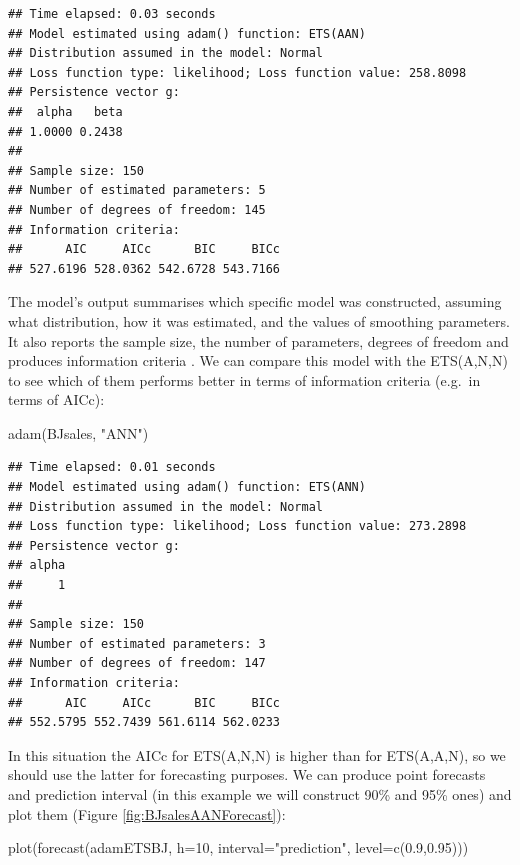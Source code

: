 \documentclass[
]{book}
\newenvironment{Shaded}{\begin{snugshade}}{\end{snugshade}}
\newcommand{\AttributeTok}[1]{\textcolor[rgb]{0.77,0.63,0.00}{#1}}
\newcommand{\DecValTok}[1]{\textcolor[rgb]{0.00,0.00,0.81}{#1}}
\newcommand{\FloatTok}[1]{\textcolor[rgb]{0.00,0.00,0.81}{#1}}
\newcommand{\FunctionTok}[1]{\textcolor[rgb]{0.00,0.00,0.00}{#1}}
\newcommand{\NormalTok}[1]{#1}
\newcommand{\StringTok}[1]{\textcolor[rgb]{0.31,0.60,0.02}{#1}}
\theoremstyle{definition}
\theoremstyle{definition}
\theoremstyle{definition}
\theoremstyle{definition}
\theoremstyle{remark}
\begin{document}
\begin{verbatim}
## Time elapsed: 0.03 seconds
## Model estimated using adam() function: ETS(AAN)
## Distribution assumed in the model: Normal
## Loss function type: likelihood; Loss function value: 258.8098
## Persistence vector g:
##  alpha   beta 
## 1.0000 0.2438 
## 
## Sample size: 150
## Number of estimated parameters: 5
## Number of degrees of freedom: 145
## Information criteria:
##      AIC     AICc      BIC     BICc 
## 527.6196 528.0362 542.6728 543.7166
\end{verbatim}

The model's output summarises which specific model was constructed, assuming what distribution, how it was estimated, and the values of smoothing parameters. It also reports the sample size, the number of parameters, degrees of freedom and produces information criteria \citep[see Section 13.4 of][]{SvetunkovSBA}. We can compare this model with the ETS(A,N,N) to see which of them performs better in terms of information criteria (e.g.~in terms of AICc):

\begin{Shaded}
\begin{Highlighting}[]
\FunctionTok{adam}\NormalTok{(BJsales, }\StringTok{"ANN"}\NormalTok{)}
\end{Highlighting}
\end{Shaded}

\begin{verbatim}
## Time elapsed: 0.01 seconds
## Model estimated using adam() function: ETS(ANN)
## Distribution assumed in the model: Normal
## Loss function type: likelihood; Loss function value: 273.2898
## Persistence vector g:
## alpha 
##     1 
## 
## Sample size: 150
## Number of estimated parameters: 3
## Number of degrees of freedom: 147
## Information criteria:
##      AIC     AICc      BIC     BICc 
## 552.5795 552.7439 561.6114 562.0233
\end{verbatim}

In this situation the AICc for ETS(A,N,N) is higher than for ETS(A,A,N), so we should use the latter for forecasting purposes. We can produce point forecasts and prediction interval (in this example we will construct 90\% and 95\% ones) and plot them (Figure \ref{fig:BJsalesAANForecast}):

\begin{Shaded}
\begin{Highlighting}[]
\FunctionTok{plot}\NormalTok{(}\FunctionTok{forecast}\NormalTok{(adamETSBJ, }\AttributeTok{h=}\DecValTok{10}\NormalTok{,}
              \AttributeTok{interval=}\StringTok{"prediction"}\NormalTok{, }\AttributeTok{level=}\FunctionTok{c}\NormalTok{(}\FloatTok{0.9}\NormalTok{,}\FloatTok{0.95}\NormalTok{)))}
\end{Highlighting}
\end{Shaded}
\end{document}
